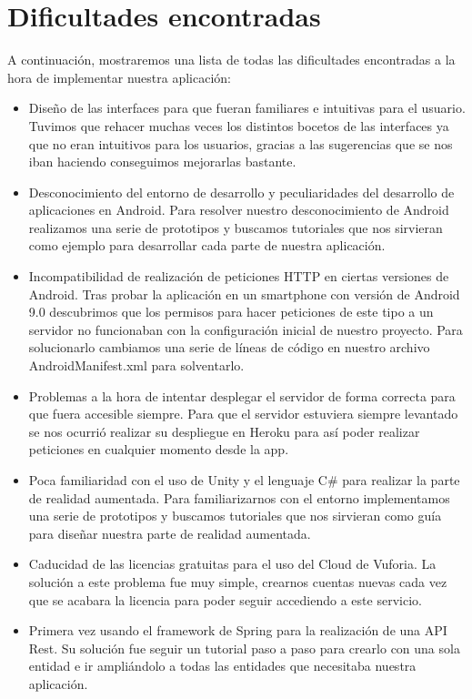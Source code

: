 \section{Dificultades encontradas}
\label{makereference4.7}
A continuación, mostraremos una lista de todas las dificultades encontradas a la hora de implementar nuestra aplicación:
\begin{itemize}
    \item Diseño de las interfaces para que fueran familiares e intuitivas para el usuario. Tuvimos que rehacer muchas veces los distintos bocetos de las interfaces ya que no eran intuitivos para los usuarios, gracias a las sugerencias que se nos iban haciendo conseguimos mejorarlas bastante.
    \item Desconocimiento del entorno de desarrollo y peculiaridades del desarrollo de aplicaciones en Android. Para resolver nuestro desconocimiento de Android realizamos una serie de prototipos y buscamos tutoriales que nos sirvieran como ejemplo para desarrollar cada parte de nuestra aplicación.
    \item Incompatibilidad de realización de peticiones HTTP en ciertas versiones de Android. Tras probar la aplicación en un smartphone con versión de Android 9.0 descubrimos que los permisos para hacer peticiones de este tipo a un servidor no funcionaban con la configuración inicial de nuestro proyecto. Para solucionarlo cambiamos una serie de líneas de código en nuestro archivo AndroidManifest.xml para solventarlo.
    \item Problemas a la hora de intentar desplegar el servidor de forma correcta para que fuera accesible siempre. Para que el servidor estuviera siempre levantado se nos ocurrió realizar su despliegue en Heroku para así poder realizar peticiones en cualquier momento desde la app.
    \item Poca familiaridad con el uso de Unity y el lenguaje C\# para realizar la parte de realidad aumentada. Para familiarizarnos con el entorno implementamos una serie de prototipos y buscamos tutoriales que nos sirvieran como guía para diseñar nuestra parte de realidad aumentada. 
    \item Caducidad de las licencias gratuitas para el uso del Cloud de Vuforia. La solución a este problema fue muy simple, crearnos cuentas nuevas cada vez que se acabara la licencia para poder seguir accediendo a este servicio.
    \item Primera vez usando el framework de Spring para la realización de una API Rest. Su solución fue seguir un tutorial paso a paso para crearlo con una sola entidad e ir ampliándolo a todas las entidades que necesitaba nuestra aplicación.

\end{itemize}
